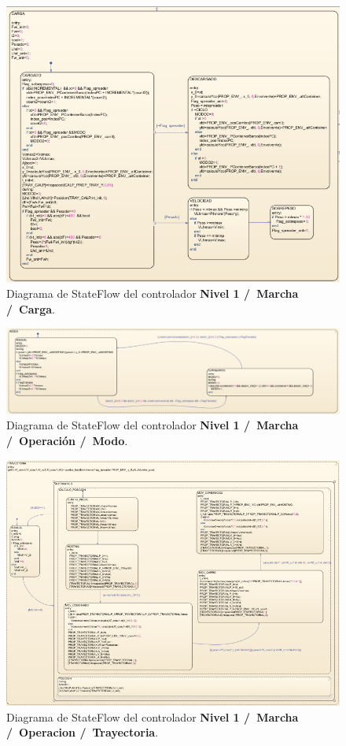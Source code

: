 \documentclass[11pt]{article}
\begin{document}
\begin{figure}
	\centering
	\includegraphics[width=1\textwidth]{images/imagen_17_nivel_1_carga.png}
	\caption{Diagrama de StateFlow del controlador \textbf{Nivel 1 /\ Marcha /\ Carga}.}
	\label{fig:nivel_1_carga}
\end{figure}

\begin{figure}
	\centering
	\includegraphics[width=1\textwidth]{images/imagen_18_nivel_1_modo.png}
	\caption{Diagrama de StateFlow del controlador \textbf{Nivel 1 /\ Marcha /\ Operación /\ Modo}.}
	\label{fig:nivel_1_modo}
\end{figure}

\begin{figure}
	\centering
	\includegraphics[width=1\textwidth]{images/imagen_19_nivel_1_trayectoria.png}
	\caption{Diagrama de StateFlow del controlador \textbf{Nivel 1 /\ Marcha /\ Operacion /\ Trayectoria}.}
	\label{fig:nivel_1_trayectoria}
\end{figure}
\end{document}
